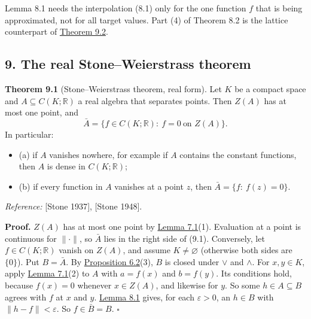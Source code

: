 \documentclass[
  english,
  11pt,
  a4paper,
]{article}
\providecommand{\tightlist}{%
  \setlength{\itemsep}{0pt}\setlength{\parskip}{0pt}}
\begin{document}
Lemma 8.1 needs the interpolation (8.1) only for the one function \(f\)
that is being approximated, not for all target values. Part (4) of
Theorem 8.2 is the lattice counterpart of
\hyperlink{the-stone-weierstrass-theorem-for-functions-vanishing-at-infinity--oa-fnd-sw-08}{Theorem
9.2}.

\subsection[9. The real Stone--Weierstrass
theorem]{\texorpdfstring{\protect\hypertarget{the-stone-weierstrass-theorem-for-functions-vanishing-at-infinity--oa-fnd-sw-07}{}{}\protect\hypertarget{the-stone-weierstrass-theorem-for-functions-vanishing-at-infinity--OA-FND-SW-08}{}{}\protect\hypertarget{the-stone-weierstrass-theorem-for-functions-vanishing-at-infinity--oa-fnd-sw-08}{}{}9.
The real Stone--Weierstrass
theorem}{9. The real Stone--Weierstrass theorem}}\label{the-stone-weierstrass-theorem-for-functions-vanishing-at-infinity--OA-FND-SW-07}

\textbf{Theorem 9.1} (Stone--Weierstrass theorem, real form). Let \(K\)
be a compact space and \(A\subseteq C(K;\mathbb R)\) a real algebra that
separates points. Then \(Z(A)\) has at most one point, and
\[\bar A=\{f\in C(K;\mathbb R):\ f=0\ \text{on }Z(A)\}.
\tag{9.1}\] In particular:

\begin{itemize}
\tightlist
\item
  (a) if \(A\) vanishes nowhere, for example if \(A\) contains the
  constant functions, then \(A\) is dense in \(C(K;\mathbb R)\);
\item
  (b) if every function in \(A\) vanishes at a point \(z\), then
  \(\bar A=\{f:\ f(z)=0\}\).
\end{itemize}

\emph{Reference:} {[}Stone 1937{]}, {[}Stone 1948{]}.

\textbf{Proof.} \(Z(A)\) has at most one point by
\hyperlink{the-stone-weierstrass-theorem-for-functions-vanishing-at-infinity--oa-fnd-sw-05}{Lemma
7.1}(1). Evaluation at a point is continuous for \(\|\cdot\|\), so
\(\bar A\) lies in the right side of (9.1). Conversely, let
\(f\in C(K;\mathbb R)\) vanish on \(Z(A)\), and assume
\(K\neq\varnothing\) (otherwise both sides are \(\{0\}\)). Put
\(B=\bar A\). By
\hyperlink{the-stone-weierstrass-theorem-for-functions-vanishing-at-infinity--oa-fnd-sw-04}{Proposition
6.2}(3), \(B\) is closed under \(\vee\) and \(\wedge\). For
\(x,y\in K\), apply
\hyperlink{the-stone-weierstrass-theorem-for-functions-vanishing-at-infinity--oa-fnd-sw-05}{Lemma
7.1}(2) to \(A\) with \(a=f(x)\) and \(b=f(y)\). Its conditions hold,
because \(f(x)=0\) whenever \(x\in Z(A)\), and likewise for \(y\). So
some \(h\in A\subseteq B\) agrees with \(f\) at \(x\) and \(y\).
\hyperlink{the-stone-weierstrass-theorem-for-functions-vanishing-at-infinity--oa-fnd-sw-06}{Lemma
8.1} gives, for each \(\varepsilon>0\), an \(h\in B\) with
\(\|h-f\|<\varepsilon\). So \(f\in\bar B=B\). \(\square\)
\end{document}
